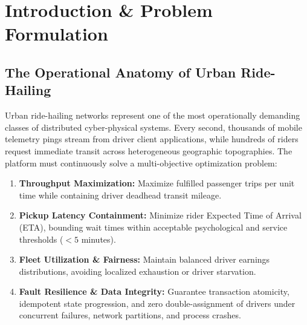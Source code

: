 \documentclass[11pt,a4paper]{article}
\begin{document}
\section{Introduction \& Problem Formulation}

\subsection{The Operational Anatomy of Urban Ride-Hailing}
Urban ride-hailing networks represent one of the most operationally demanding classes of distributed cyber-physical systems. Every second, thousands of mobile telemetry pings stream from driver client applications, while hundreds of riders request immediate transit across heterogeneous geographic topographies. The platform must continuously solve a multi-objective optimization problem:
\begin{enumerate}[leftmargin=1.5em]
    \item \textbf{Throughput Maximization:} Maximize fulfilled passenger trips per unit time while containing driver deadhead transit mileage.
    \item \textbf{Pickup Latency Containment:} Minimize rider Expected Time of Arrival (ETA), bounding wait times within acceptable psychological and service thresholds ($< 5$ minutes).
    \item \textbf{Fleet Utilization \& Fairness:} Maintain balanced driver earnings distributions, avoiding localized exhaustion or driver starvation.
    \item \textbf{Fault Resilience \& Data Integrity:} Guarantee transaction atomicity, idempotent state progression, and zero double-assignment of drivers under concurrent failures, network partitions, and process crashes.
\end{enumerate}
\end{document}
